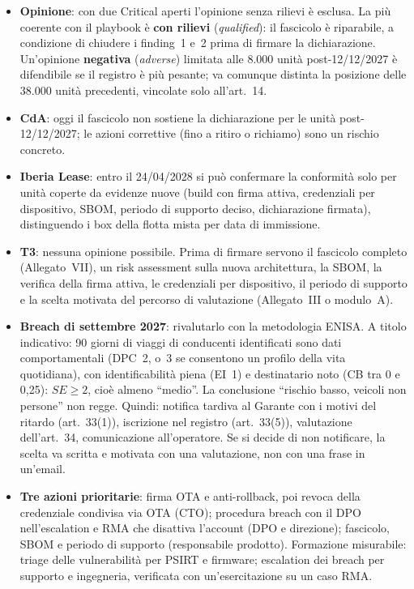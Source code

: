 \begin{integrazione}
\begin{itemize}
  \item \textbf{Opinione}: con due Critical aperti l'opinione senza rilievi è esclusa. La più
    coerente con il playbook è \textbf{con rilievi} (\emph{qualified}): il fascicolo è riparabile, a
    condizione di chiudere i finding~1 e~2 prima di firmare la dichiarazione. Un'opinione
    \textbf{negativa} (\emph{adverse}) limitata alle 8.000 unità post-12/12/2027 è difendibile se il
    registro è più pesante; va comunque distinta la posizione delle 38.000 unità precedenti, vincolate
    solo all'art.~14.
  \item \textbf{CdA}: oggi il fascicolo non sostiene la dichiarazione per le unità post-12/12/2027;
    le azioni correttive (fino a ritiro o richiamo) sono un rischio concreto.
  \item \textbf{Iberia Lease}: entro il 24/04/2028 si può confermare la conformità solo per unità
    coperte da evidenze nuove (build con firma attiva, credenziali per dispositivo, SBOM, periodo di
    supporto deciso, dichiarazione firmata), distinguendo i box della flotta mista per data di
    immissione.
  \item \textbf{T3}: nessuna opinione possibile. Prima di firmare servono il fascicolo completo
    (Allegato~VII), un risk assessment sulla nuova architettura, la SBOM, la verifica della firma
    attiva, le credenziali per dispositivo, il periodo di supporto e la scelta motivata del percorso
    di valutazione (Allegato~III o modulo~A).
  \item \textbf{Breach di settembre 2027}: rivalutarlo con la metodologia ENISA. A titolo indicativo:
    90 giorni di viaggi di conducenti identificati sono dati comportamentali (DPC~2, o~3 se consentono
    un profilo della vita quotidiana), con identificabilità piena (EI~1) e destinatario noto (CB tra
    0 e 0,25): $SE \geq 2$, cioè almeno ``medio''. La conclusione ``rischio basso, veicoli non persone''
    non regge. Quindi: notifica tardiva al Garante con i motivi del ritardo (art.~33(1)), iscrizione
    nel registro (art.~33(5)), valutazione dell'art.~34, comunicazione all'operatore. Se si decide di
    non notificare, la scelta va scritta e motivata con una valutazione, non con una frase in un'email.
  \item \textbf{Tre azioni prioritarie}: firma OTA e anti-rollback, poi revoca della credenziale
    condivisa via OTA (CTO); procedura breach con il DPO nell'escalation e RMA che disattiva l'account
    (DPO e direzione); fascicolo, SBOM e periodo di supporto (responsabile prodotto). Formazione
    misurabile: triage delle vulnerabilità per PSIRT e firmware; escalation dei breach per supporto e
    ingegneria, verificata con un'esercitazione su un caso RMA.
\end{itemize}
\end{integrazione}

